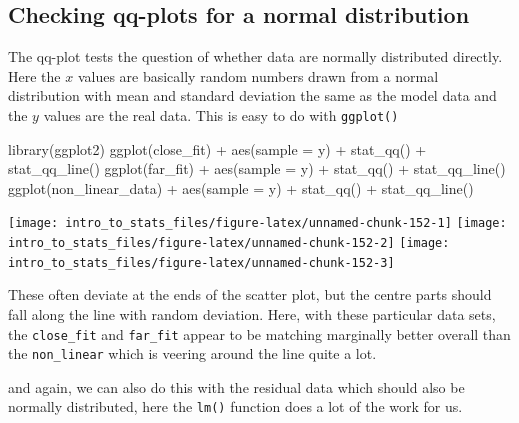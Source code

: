 \documentclass[
]{book}
\newenvironment{Shaded}{\begin{snugshade}}{\end{snugshade}}
\newcommand{\AttributeTok}[1]{\textcolor[rgb]{0.77,0.63,0.00}{#1}}
\newcommand{\FunctionTok}[1]{\textcolor[rgb]{0.00,0.00,0.00}{#1}}
\newcommand{\NormalTok}[1]{#1}
\newcommand{\SpecialCharTok}[1]{\textcolor[rgb]{0.00,0.00,0.00}{#1}}
\begin{document}
\hypertarget{checking-qq-plots-for-a-normal-distribution}{%
\subsection{Checking qq-plots for a normal distribution}\label{checking-qq-plots-for-a-normal-distribution}}

The qq-plot tests the question of whether data are normally distributed directly. Here the \(x\) values are basically random numbers drawn from a normal distribution with mean and standard deviation the same as the model data and the \(y\) values are the real data. This is easy to do with \texttt{ggplot()}

\begin{Shaded}
\begin{Highlighting}[]
\FunctionTok{library}\NormalTok{(ggplot2)}
\FunctionTok{ggplot}\NormalTok{(close\_fit) }\SpecialCharTok{+} \FunctionTok{aes}\NormalTok{(}\AttributeTok{sample =}\NormalTok{ y) }\SpecialCharTok{+} \FunctionTok{stat\_qq}\NormalTok{() }\SpecialCharTok{+} \FunctionTok{stat\_qq\_line}\NormalTok{()}
\FunctionTok{ggplot}\NormalTok{(far\_fit) }\SpecialCharTok{+} \FunctionTok{aes}\NormalTok{(}\AttributeTok{sample =}\NormalTok{ y) }\SpecialCharTok{+} \FunctionTok{stat\_qq}\NormalTok{() }\SpecialCharTok{+} \FunctionTok{stat\_qq\_line}\NormalTok{()}
\FunctionTok{ggplot}\NormalTok{(non\_linear\_data) }\SpecialCharTok{+} \FunctionTok{aes}\NormalTok{(}\AttributeTok{sample =}\NormalTok{ y) }\SpecialCharTok{+} \FunctionTok{stat\_qq}\NormalTok{() }\SpecialCharTok{+} \FunctionTok{stat\_qq\_line}\NormalTok{()}
\end{Highlighting}
\end{Shaded}

\texttt{[image: intro\_to\_stats\_files/figure-latex/unnamed-chunk-152-1]} \texttt{[image: intro\_to\_stats\_files/figure-latex/unnamed-chunk-152-2]} \texttt{[image: intro\_to\_stats\_files/figure-latex/unnamed-chunk-152-3]}

These often deviate at the ends of the scatter plot, but the centre parts should fall along the line with random deviation. Here, with these particular data sets, the \texttt{close\_fit} and \texttt{far\_fit} appear to be matching marginally better overall than the \texttt{non\_linear} which is veering around the line quite a lot.

and again, we can also do this with the residual data which should also be normally distributed, here the \texttt{lm()} function does a lot of the work for us.
\end{document}
